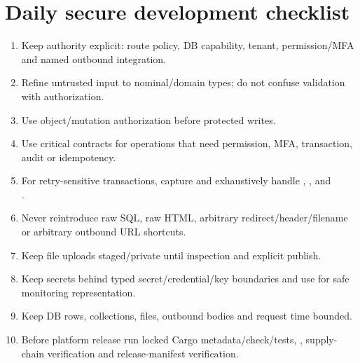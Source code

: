 \section{Daily secure development checklist}

\begin{enumerate}
  \item Keep authority explicit: route policy, DB capability, tenant, permission/MFA and named outbound integration.
  \item Refine untrusted input to nominal/domain types; do not confuse validation with authorization.
  \item Use object/mutation authorization before protected writes.
  \item Use critical contracts for operations that need permission, MFA, transaction, audit or idempotency.
  \item For retry-sensitive transactions, capture and exhaustively handle , , and\\ .
  \item Never reintroduce raw SQL, raw HTML, arbitrary redirect/header/filename or arbitrary outbound URL shortcuts.
  \item Keep file uploads staged/private until inspection and explicit publish.
  \item Keep secrets behind typed secret/credential/key boundaries and use  for safe monitoring representation.
  \item Keep DB rows, collections, files, outbound bodies and request time bounded.
  \item Before platform release run locked Cargo metadata/check/tests, , supply-chain verification and release-manifest verification.
\end{enumerate}
